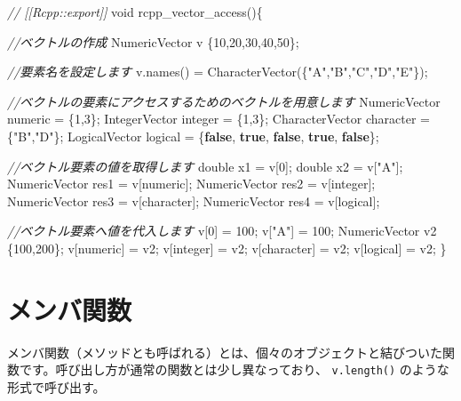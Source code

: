 \documentclass[]{book}
\newenvironment{Shaded}{\begin{snugshade}}{\end{snugshade}}
\newcommand{\CommentTok}[1]{\textcolor[rgb]{0.56,0.35,0.01}{\textit{#1}}}
\newcommand{\DataTypeTok}[1]{\textcolor[rgb]{0.13,0.29,0.53}{#1}}
\newcommand{\DecValTok}[1]{\textcolor[rgb]{0.00,0.00,0.81}{#1}}
\newcommand{\KeywordTok}[1]{\textcolor[rgb]{0.13,0.29,0.53}{\textbf{#1}}}
\newcommand{\NormalTok}[1]{#1}
\newcommand{\StringTok}[1]{\textcolor[rgb]{0.31,0.60,0.02}{#1}}
\begin{document}
\begin{Shaded}
\begin{Highlighting}[]
\CommentTok{// [[Rcpp::export]]}
\DataTypeTok{void}\NormalTok{ rcpp_vector_access()\{}

  \CommentTok{//ベクトルの作成}
\NormalTok{  NumericVector v  \{}\DecValTok{10}\NormalTok{,}\DecValTok{20}\NormalTok{,}\DecValTok{30}\NormalTok{,}\DecValTok{40}\NormalTok{,}\DecValTok{50}\NormalTok{\};}

  \CommentTok{//要素名を設定します}
\NormalTok{  v.names() = CharacterVector(\{}\StringTok{"A"}\NormalTok{,}\StringTok{"B"}\NormalTok{,}\StringTok{"C"}\NormalTok{,}\StringTok{"D"}\NormalTok{,}\StringTok{"E"}\NormalTok{\});}

  \CommentTok{//ベクトルの要素にアクセスするためのベクトルを用意します}
\NormalTok{  NumericVector   numeric = \{}\DecValTok{1}\NormalTok{,}\DecValTok{3}\NormalTok{\};}
\NormalTok{  IntegerVector   integer = \{}\DecValTok{1}\NormalTok{,}\DecValTok{3}\NormalTok{\};}
\NormalTok{  CharacterVector character = \{}\StringTok{"B"}\NormalTok{,}\StringTok{"D"}\NormalTok{\};}
\NormalTok{  LogicalVector   logical = \{}\KeywordTok{false}\NormalTok{, }\KeywordTok{true}\NormalTok{, }\KeywordTok{false}\NormalTok{, }\KeywordTok{true}\NormalTok{, }\KeywordTok{false}\NormalTok{\};}

  \CommentTok{//ベクトル要素の値を取得します}
  \DataTypeTok{double}\NormalTok{ x1 = v[}\DecValTok{0}\NormalTok{];}
  \DataTypeTok{double}\NormalTok{ x2 = v[}\StringTok{"A"}\NormalTok{];}
\NormalTok{  NumericVector res1 = v[numeric];}
\NormalTok{  NumericVector res2 = v[integer];}
\NormalTok{  NumericVector res3 = v[character];}
\NormalTok{  NumericVector res4 = v[logical];}

  \CommentTok{//ベクトル要素へ値を代入します}
\NormalTok{  v[}\DecValTok{0}\NormalTok{]   = }\DecValTok{100}\NormalTok{;}
\NormalTok{  v[}\StringTok{"A"}\NormalTok{] = }\DecValTok{100}\NormalTok{;}
\NormalTok{  NumericVector v2 \{}\DecValTok{100}\NormalTok{,}\DecValTok{200}\NormalTok{\};}
\NormalTok{  v[numeric]   = v2;}
\NormalTok{  v[integer]   = v2;}
\NormalTok{  v[character] = v2;}
\NormalTok{  v[logical]   = v2;}
\NormalTok{\}}
\end{Highlighting}
\end{Shaded}

\section{メンバ関数}

メンバ関数（メソッドとも呼ばれる）とは、個々のオブジェクトと結びついた関数です。呼び出し方が通常の関数とは少し異なっており、 \texttt{v.length()} のような形式で呼び出す。
\end{document}

